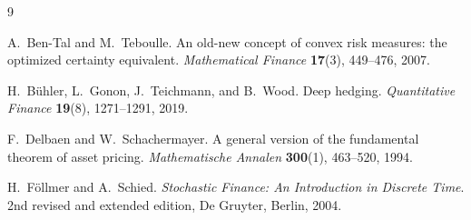 \documentclass[11pt,a4paper]{report}
\begin{document}
\begin{thebibliography}{9}

    A.~Ben-Tal and M.~Teboulle.
    An old-new concept of convex risk measures: the optimized certainty equivalent.
    \emph{Mathematical Finance} \textbf{17}(3), 449--476, 2007.

    H.~B\"uhler, L.~Gonon, J.~Teichmann, and B.~Wood.
    Deep hedging.
    \emph{Quantitative Finance} \textbf{19}(8), 1271--1291, 2019.

    F.~Delbaen and W.~Schachermayer.
    A general version of the fundamental theorem of asset pricing.
    \emph{Mathematische Annalen} \textbf{300}(1), 463--520, 1994.

    H.~F\"ollmer and A.~Schied.
    \emph{Stochastic Finance: An Introduction in Discrete Time}.
    2nd revised and extended edition, De Gruyter, Berlin, 2004.

\end{thebibliography}
\end{document}
